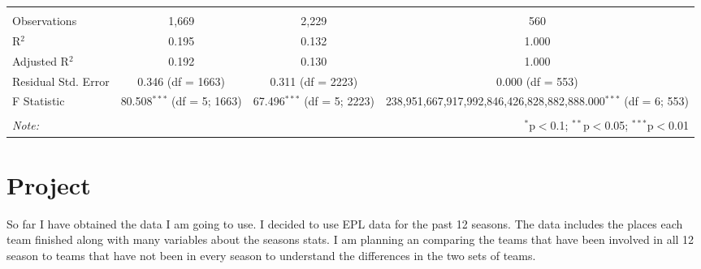 \documentclass{article}
\begin{document}
\begin{table}[!htbp]
\begin{tabular}{@{\extracolsep{5pt}}lccc}
  & & & \\ 
\hline \\[-1.8ex] 
Observations & 1,669 & 2,229 & 560 \\ 
R$^{2}$ & 0.195 & 0.132 & 1.000 \\ 
Adjusted R$^{2}$ & 0.192 & 0.130 & 1.000 \\ 
Residual Std. Error & 0.346 (df = 1663) & 0.311 (df = 2223) & 0.000 (df = 553) \\ 
F Statistic & 80.508$^{***}$ (df = 5; 1663) & 67.496$^{***}$ (df = 5; 2223) & 238,951,667,917,992,846,426,828,882,888.000$^{***}$ (df = 6; 553) \\ 
\hline 
\hline \\[-1.8ex] 
\textit{Note:}  & \multicolumn{3}{r}{$^{*}$p$<$0.1; $^{**}$p$<$0.05; $^{***}$p$<$0.01} \\ 
\end{tabular} 
\end{table} 

\section{Project}
So far I have obtained the data I am going to use. I decided to use EPL data for the past 12 seasons. The data includes the places each team finished along with many variables about the seasons stats. I am planning an comparing the teams that have been involved in all 12 season to teams that have not been in every season to understand the differences in the two sets of teams. 
\end{document}
